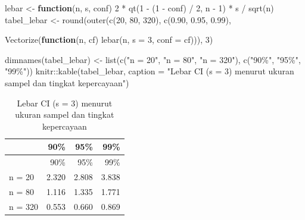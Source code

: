\documentclass[
  indonesian,
  letterpaper,
]{book}
\newenvironment{Shaded}{\begin{snugshade}}{\end{snugshade}}
\newcommand{\AttributeTok}[1]{\textcolor[rgb]{0.40,0.45,0.13}{#1}}
\newcommand{\ControlFlowTok}[1]{\textcolor[rgb]{0.00,0.23,0.31}{\textbf{#1}}}
\newcommand{\DecValTok}[1]{\textcolor[rgb]{0.68,0.00,0.00}{#1}}
\newcommand{\FloatTok}[1]{\textcolor[rgb]{0.68,0.00,0.00}{#1}}
\newcommand{\FunctionTok}[1]{\textcolor[rgb]{0.28,0.35,0.67}{#1}}
\newcommand{\NormalTok}[1]{\textcolor[rgb]{0.00,0.23,0.31}{#1}}
\newcommand{\OtherTok}[1]{\textcolor[rgb]{0.00,0.23,0.31}{#1}}
\newcommand{\SpecialCharTok}[1]{\textcolor[rgb]{0.37,0.37,0.37}{#1}}
\newcommand{\StringTok}[1]{\textcolor[rgb]{0.13,0.47,0.30}{#1}}
\begin{document}
\begin{Shaded}
\begin{Highlighting}[]
\NormalTok{lebar }\OtherTok{\textless{}{-}} \ControlFlowTok{function}\NormalTok{(n, s, conf) }\DecValTok{2} \SpecialCharTok{*} \FunctionTok{qt}\NormalTok{(}\DecValTok{1} \SpecialCharTok{{-}}\NormalTok{ (}\DecValTok{1} \SpecialCharTok{{-}}\NormalTok{ conf) }\SpecialCharTok{/} \DecValTok{2}\NormalTok{, n }\SpecialCharTok{{-}} \DecValTok{1}\NormalTok{) }\SpecialCharTok{*}\NormalTok{ s }\SpecialCharTok{/} \FunctionTok{sqrt}\NormalTok{(n)}
\NormalTok{tabel\_lebar }\OtherTok{\textless{}{-}} \FunctionTok{round}\NormalTok{(}\FunctionTok{outer}\NormalTok{(}\FunctionTok{c}\NormalTok{(}\DecValTok{20}\NormalTok{, }\DecValTok{80}\NormalTok{, }\DecValTok{320}\NormalTok{), }\FunctionTok{c}\NormalTok{(}\FloatTok{0.90}\NormalTok{, }\FloatTok{0.95}\NormalTok{, }\FloatTok{0.99}\NormalTok{),}

\FunctionTok{Vectorize}\NormalTok{(}\ControlFlowTok{function}\NormalTok{(n, cf) }\FunctionTok{lebar}\NormalTok{(n, }\AttributeTok{s =} \DecValTok{3}\NormalTok{, }\AttributeTok{conf =}\NormalTok{ cf))), }\DecValTok{3}\NormalTok{)}

\FunctionTok{dimnames}\NormalTok{(tabel\_lebar) }\OtherTok{\textless{}{-}} \FunctionTok{list}\NormalTok{(}\FunctionTok{c}\NormalTok{(}\StringTok{"n = 20"}\NormalTok{, }\StringTok{"n = 80"}\NormalTok{, }\StringTok{"n = 320"}\NormalTok{), }\FunctionTok{c}\NormalTok{(}\StringTok{"90\%"}\NormalTok{, }\StringTok{"95\%"}\NormalTok{, }\StringTok{"99\%"}\NormalTok{))}
\NormalTok{knitr}\SpecialCharTok{::}\FunctionTok{kable}\NormalTok{(tabel\_lebar, }\AttributeTok{caption =} \StringTok{"Lebar CI (s = 3) menurut ukuran sampel dan tingkat kepercayaan"}\NormalTok{)}
\end{Highlighting}
\end{Shaded}

\begin{longtable}[]{@{}lrrr@{}}
\caption{Lebar CI (s = 3) menurut ukuran sampel dan tingkat
kepercayaan}\tabularnewline
\toprule\noalign{}
& 90\% & 95\% & 99\% \\
\midrule\noalign{}
\endfirsthead
\toprule\noalign{}
& 90\% & 95\% & 99\% \\
\midrule\noalign{}
\endhead
\bottomrule\noalign{}
\endlastfoot
n = 20 & 2.320 & 2.808 & 3.838 \\
n = 80 & 1.116 & 1.335 & 1.771 \\
n = 320 & 0.553 & 0.660 & 0.869 \\
\end{longtable}
\end{document}
